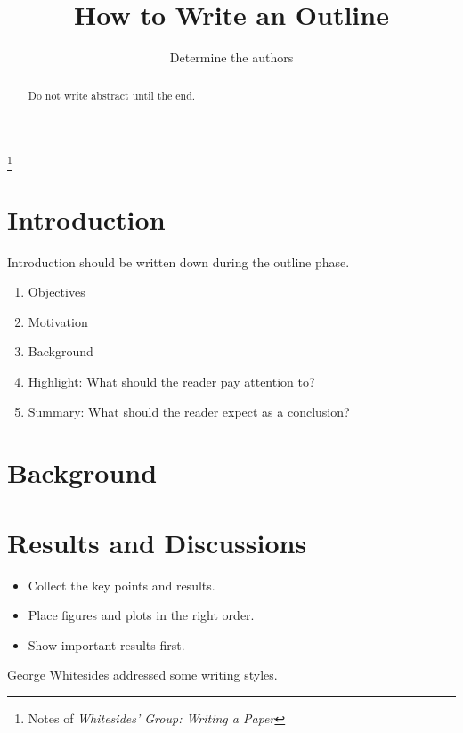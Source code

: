 \documentclass[%
 reprint,
 amsmath,amssymb,
 aps,
]{revtex4-1}
\begin{document}
\title{How to Write an Outline}%
\thanks{Notes of \em{Whitesides' Group: Writing a Paper} }%

\author{Determine the authors}



\begin{abstract}
Do not write abstract until the end.

\end{abstract}

\maketitle



\section{\label{introduction}Introduction}

Introduction should be written down during the outline phase.


\begin{enumerate}
    \item Objectives
    \item Motivation
    \item Background
    \item Highlight: What should the reader pay attention to?
    \item Summary: What should the reader expect as a conclusion?
\end{enumerate}


\section{\label{background}Background}

\section{\label{results}Results and Discussions}


\begin{itemize}
\item Collect the key points and results.
\item Place figures and plots in the right order.
\item Show important results first.
\end{itemize}


George Whitesides addressed some writing styles.\cite{Whitesides2004}
\end{document}
